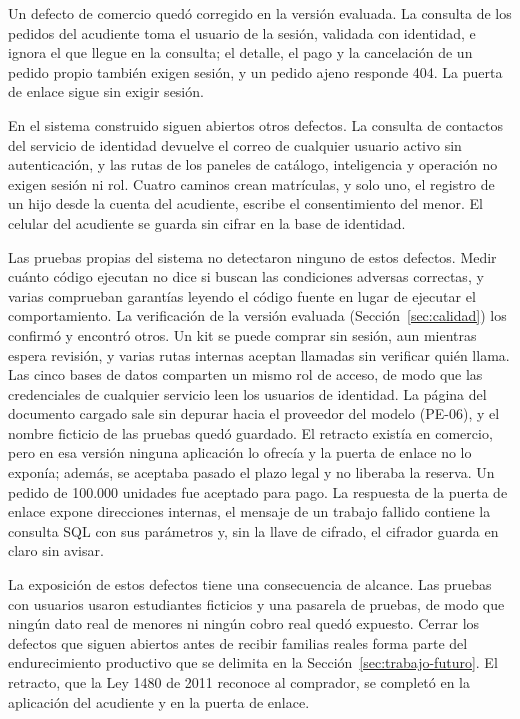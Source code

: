 Un defecto de comercio quedó corregido en la versión evaluada. La consulta de los pedidos del
acudiente toma el usuario de la sesión, validada con identidad, e ignora el que llegue en la
consulta; el detalle, el pago y la cancelación de un pedido propio también exigen sesión, y un
pedido ajeno responde 404. La puerta de enlace sigue sin exigir sesión.

En el sistema construido siguen abiertos otros defectos. La consulta de contactos del servicio de identidad devuelve el correo de
cualquier usuario activo sin autenticación, y las rutas de los paneles de catálogo, inteligencia y
operación no exigen sesión ni rol. Cuatro caminos crean matrículas, y solo uno, el registro de un
hijo desde la cuenta del acudiente, escribe el consentimiento del menor. El celular del acudiente se
guarda sin cifrar en la base de identidad.

Las pruebas propias del sistema no detectaron ninguno de estos defectos. Medir cuánto código
ejecutan no dice si buscan las condiciones adversas correctas, y varias comprueban garantías leyendo
el código fuente en lugar de ejecutar el comportamiento. La verificación de la versión evaluada
(Sección~\ref{sec:calidad}) los confirmó y encontró otros. Un kit se puede comprar sin sesión, aun
mientras espera revisión, y varias rutas internas aceptan llamadas sin verificar quién llama. Las
cinco bases de datos comparten un mismo rol de acceso, de modo que las credenciales de cualquier
servicio leen los usuarios de identidad. La página del documento cargado sale sin depurar hacia el
proveedor del modelo (\mbox{PE-06}), y el nombre ficticio de las pruebas quedó guardado. El retracto existía
en comercio, pero en esa versión ninguna aplicación lo ofrecía y la puerta de enlace no lo exponía; además, se aceptaba
pasado el plazo legal y no liberaba la reserva. Un pedido de 100.000 unidades fue aceptado para pago.
La respuesta de la puerta de enlace expone direcciones internas, el mensaje de un trabajo fallido
contiene la consulta SQL con sus parámetros y, sin la llave de cifrado, el cifrador guarda en claro
sin avisar.

La exposición de estos defectos tiene una consecuencia de alcance. Las pruebas con usuarios usaron
estudiantes ficticios y una pasarela de pruebas, de modo que ningún dato real de menores ni ningún
cobro real quedó expuesto. Cerrar los defectos que siguen abiertos antes de recibir familias reales
forma parte del endurecimiento productivo que se delimita en la
Sección~\ref{sec:trabajo-futuro}. El retracto, que la Ley 1480 de 2011 reconoce al comprador, se
completó en la aplicación del acudiente y en la puerta de enlace.

